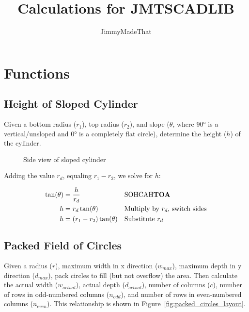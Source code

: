 \documentclass{article}
\begin{document}
\title{Calculations for JMTSCADLIB}
\author{JimmyMadeThat}
\maketitle

\section{Functions}

\subsection{Height of Sloped Cylinder}

Given a bottom radius ($r_1$), top radius ($r_2$), and slope ($\theta$, where 90° is a vertical/unsloped and 0° is a completely flat circle), determine the height ($h$) of the cylinder.

\begin{figure}[h!]
\centering
{}
\caption{Side view of sloped cylinder}\label{fig:sloped_cylinder}
\end{figure}

Adding the value $r_d$, equaling $r_1 - r_2$, we solve for $h$:

\begin{align*}
    \tan(\theta) &= \frac{h}{r_d} && \text{SOHCAH\textbf{TOA}} \\
    h &= r_d \tan(\theta) && \text{Multiply by $r_d$, switch sides} \\
    h &= (r_1 - r_2) \tan(\theta) && \text{Substitute $r_d$}
\end{align*}

\subsection{Packed Field of Circles}

Given a radius ($r$), maximum width in x direction ($w_{max}$), maximum depth in y direction ($d_{max}$), pack circles to fill (but not overflow) the area. Then calculate the actual width ($w_{actual}$), actual depth ($d_{actual}$), number of columns ($c$), number of rows in odd-numbered columns ($n_{odd}$), and number of rows in even-numbered columns ($n_{even}$). This relationship is shown in Figure~\ref{fig:packed_circles_layout}.
\end{document}
